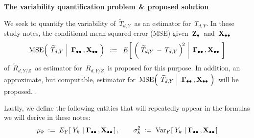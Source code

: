 \vskip 0.1cm
\begin{center}
\begin{minipage}{5.5in}
\begin{tcolorbox}[arc=8px, colback=white, colframe=black]
\begin{center}
\textbf{The variability quantification problem$\overset{{\color{white}1}}{\textnormal{\color{white}.}}$\& proposed solution}
\end{center}
We seek to quantify the variability of
\,$\widetilde{T}_{d,Y}$\,
as an estimator for
\,$T_{d,Y}$.
\vskip 0.1cm
In these study notes,
the conditional mean squared error (MSE) given \,$\mathbf{Z}_{\bullet}$\, and \,$\mathbf{X}_{\bullet\bullet}$\,
\begin{equation*}
\textnormal{MSE}\!\left(\;
    \left.
    \widetilde{T}_{d,Y}
    \;\right\vert\!
    \begin{array}{c} \mathbf{\Gamma}_{\bullet\bullet}\,,\mathbf{X}_{\bullet\bullet} \end{array}
    \!\right)
\;\; := \;\;
    E\!\left[\;\left(\,
        \left.
        \widetilde{T}_{d,Y}
        \, - \,
        T_{d,Y}
        \,\right)^{\!2}
        \;\right\vert\!
        \begin{array}{c} \mathbf{\Gamma}_{\bullet\bullet}\,,\mathbf{X}_{\bullet\bullet} \end{array}
        \!\right]
\end{equation*}
of
\,$\widetilde{R}_{d,Y/Z}$\,
as estimator for
\,$R_{d,Y/Z}$\,
is proposed for this purpose.
\vskip 0.3cm
\noindent
In addition, an approximate, but computable, estimator for
\,$
\textnormal{MSE}\!\left(\;
    \left.
    \widetilde{T}_{d,Y}
    \;\right\vert\!
    \begin{array}{c} \mathbf{\Gamma}_{\bullet\bullet}\,,\mathbf{X}_{\bullet\bullet} \end{array}
    \!\right)
$\,
will be proposed.
\vskip -0.25cm
{\color{white}.}
\end{tcolorbox}
\end{minipage}
\end{center}
\vskip 0.3cm
\noindent
Lastly, we define the following entities that will repeatedly appear
in the formulas we will derive in these notes:
\begin{equation*}
\mu_{k}
\; := \;
    E_{Y}\!\left[\;Y_{k}\,\left\vert\;\mathbf{\Gamma}_{\bullet\bullet}\,,\mathbf{X}_{\bullet\bullet}\right.\right],
\quad\quad
\sigma_{k}^{2}
\; := \;
    \textnormal{Var}_{Y}\!\left[\;
        Y_{k}
        \,\left\vert\;
        \mathbf{\Gamma}_{\bullet\bullet}\,,\mathbf{X}_{\bullet\bullet}
        \right.
        \right]
\end{equation*}

